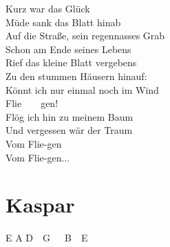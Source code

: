 \documentclass[
  letterpaper,
  a5paper]{memoir}
\begin{document}
Kurz war das Glück\\
Müde sank das Blatt hinab\\
Auf die Straße, sein regennasses Grab\\
Schon am Ende seines Lebens\\
Rief das kleine Blatt vergebens\\
Zu den stummen Häusern hinauf:\\
Könnt ich nur einmal noch im Wind\\
Flie~~~~gen!\\
Flög ich hin zu meinem Baum\\
Und vergessen wär der Traum\\
Vom Flie-gen\\
Vom Flie-gen...

\hypertarget{kaspar}{%
\chapter{Kaspar}\label{kaspar}}

E A D~~G~~~B~~E
\end{document}
